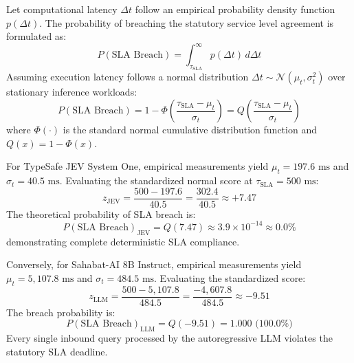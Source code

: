 \documentclass[journal,compsoc]{IEEEtran}
\begin{document}
Let computational latency $\Delta t$ follow an empirical probability density function $p(\Delta t)$. The probability of breaching the statutory service level agreement is formulated as:
\begin{equation}
P(\text{SLA Breach}) = \int_{\tau_{\text{SLA}}}^{\infty} p(\Delta t) \, d\Delta t
\end{equation}
Assuming execution latency follows a normal distribution $\Delta t \sim \mathcal{N}(\mu_t, \sigma_t^2)$ over stationary inference workloads:
\begin{equation}
P(\text{SLA Breach}) = 1 - \Phi\left(\frac{\tau_{\text{SLA}} - \mu_t}{\sigma_t}\right) = Q\left(\frac{\tau_{\text{SLA}} - \mu_t}{\sigma_t}\right)
\end{equation}
where $\Phi(\cdot)$ is the standard normal cumulative distribution function and $Q(x) = 1 - \Phi(x)$.

For TypeSafe JEV System One, empirical measurements yield $\mu_t = 197.6 \text{ ms}$ and $\sigma_t = 40.5 \text{ ms}$. Evaluating the standardized normal score at $\tau_{\text{SLA}} = 500 \text{ ms}$:
\begin{equation}
z_{\text{JEV}} = \frac{500 - 197.6}{40.5} = \frac{302.4}{40.5} \approx +7.47
\end{equation}
The theoretical probability of SLA breach is:
\begin{equation}
P(\text{SLA Breach})_{\text{JEV}} = Q(7.47) \approx 3.9 \times 10^{-14} \approx 0.0\%
\end{equation}
demonstrating complete deterministic SLA compliance.

Conversely, for Sahabat-AI 8B Instruct, empirical measurements yield $\mu_t = 5,107.8 \text{ ms}$ and $\sigma_t = 484.5 \text{ ms}$. Evaluating the standardized score:
\begin{equation}
z_{\text{LLM}} = \frac{500 - 5,107.8}{484.5} = \frac{-4,607.8}{484.5} \approx -9.51
\end{equation}
The breach probability is:
\begin{equation}
P(\text{SLA Breach})_{\text{LLM}} = Q(-9.51) = 1.000 \text{ (100.0\%)}
\end{equation}
Every single inbound query processed by the autoregressive LLM violates the statutory SLA deadline.
\end{document}

